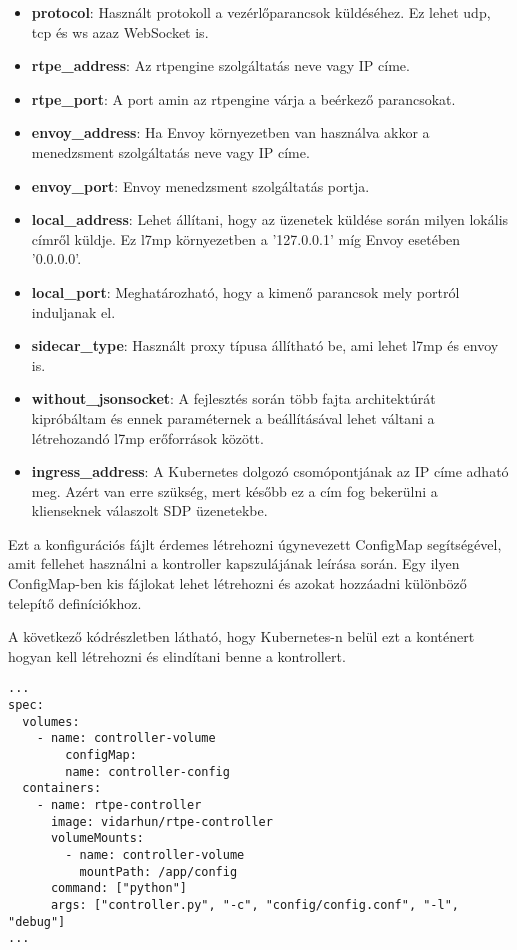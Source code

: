 \begin{itemize}
	\item \textbf{protocol}: Használt protokoll a vezérlőparancsok küldéséhez. Ez lehet
	udp, tcp és ws azaz WebSocket is.
	\item \textbf{rtpe\_address}: Az rtpengine szolgáltatás neve vagy IP címe. 
	\item \textbf{rtpe\_port}: A port amin az rtpengine várja a beérkező parancsokat. 
	\item \textbf{envoy\_address}: Ha Envoy környezetben van használva akkor a menedzsment
	szolgáltatás neve vagy IP címe. 
	\item \textbf{envoy\_port}: Envoy menedzsment szolgáltatás portja. 
	\item \textbf{local\_address}: Lehet állítani, hogy az üzenetek küldése során milyen
	lokális címről küldje. Ez l7mp környezetben a '127.0.0.1' míg Envoy esetében '0.0.0.0'.
	\item \textbf{local\_port}: Meghatározható, hogy a kimenő parancsok mely portról
	induljanak el. 
	\item \textbf{sidecar\_type}: Használt proxy típusa állítható be, ami lehet l7mp és envoy is.
	\item \textbf{without\_jsonsocket}: A fejlesztés során több fajta architektúrát kipróbáltam
	és ennek paraméternek a beállításával lehet váltani a létrehozandó l7mp erőforrások között. 
	\item \textbf{ingress\_address}: A Kubernetes dolgozó csomópontjának az IP címe adható meg.
	Azért van erre szükség, mert később ez a cím fog bekerülni a klienseknek válaszolt SDP
	üzenetekbe. 
\end{itemize}

Ezt a konfigurációs fájlt érdemes létrehozni úgynevezett ConfigMap segítségével, amit fellehet
használni a kontroller kapszulájának leírása során. Egy ilyen ConfigMap-ben kis fájlokat 
lehet létrehozni és azokat hozzáadni különböző telepítő definíciókhoz. 

A következő kódrészletben látható, hogy Kubernetes-n belül ezt a konténert hogyan kell 
létrehozni és elindítani benne a kontrollert. 

\begin{lstlisting}[caption=Kubernetes konténer specifikációja, label=lst:kubeSpec]
...
spec:
  volumes:
    - name: controller-volume
        configMap:
        name: controller-config
  containers:
    - name: rtpe-controller
      image: vidarhun/rtpe-controller
      volumeMounts:
        - name: controller-volume
          mountPath: /app/config
      command: ["python"]
      args: ["controller.py", "-c", "config/config.conf", "-l", "debug"]
...
\end{lstlisting}

